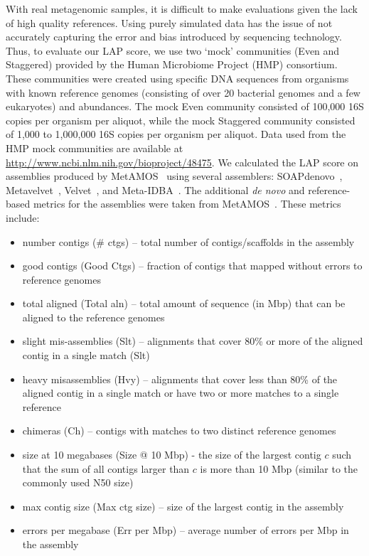 \documentclass[12pt,\mydriver]{thesis}
\begin{document}
With real metagenomic samples, it is difficult to make evaluations given the lack of high quality references.
Using purely simulated data has the issue of not accurately capturing the error and bias introduced by sequencing technology.
Thus, to evaluate our LAP score, we use two `mock' communities (Even and Staggered) provided by the Human Microbiome Project (HMP) consortium\cite{mitreva2012structure,methe2012framework}.
These communities were created using specific DNA sequences from organisms with known reference genomes (consisting of over 20 bacterial genomes and a few eukaryotes) and abundances.
The mock Even community consisted of 100,000 16S copies per organism per aliquot, while the mock Staggered community consisted of 1,000 to 1,000,000 16S copies per organism per aliquot.
Data used from the HMP mock communities are available at \url{http://www.ncbi.nlm.nih.gov/bioproject/48475}.
We calculated the LAP score on assemblies produced by MetAMOS~\cite{treangen2013metamos} using several assemblers: SOAPdenovo~\cite{luo2012soapdenovo2}, Metavelvet~\cite{namiki2012metavelvet}, Velvet~\cite{Velvet}, and Meta-IDBA~\cite{peng2011meta}.
The additional \emph{de novo} and reference-based metrics for the assemblies were taken from MetAMOS~\cite{treangen2013metamos}.  These metrics include:
   \begin{itemize}
   \item number contigs (\# ctgs) -- total number of contigs/scaffolds in the assembly
   \item good contigs (Good Ctgs) -- fraction of contigs that mapped without errors to reference genomes
   \item total aligned (Total aln) -- total amount of sequence (in Mbp) that can be aligned to the reference genomes
   \item slight mis-assemblies (Slt) -- alignments that cover 80\% or more of the aligned contig in a single match (Slt)
   \item heavy misassemblies (Hvy) -- alignments that cover less than 80\% of the aligned contig in a single match or have two or more matches to a single reference
   \item chimeras (Ch) -- contigs with matches to two distinct reference genomes
   \item size at 10 megabases (Size @ 10 Mbp) - the size of the largest contig $c$ such that the sum of all contigs larger than $c$ is more than 10 Mbp (similar to the commonly used N50 size)
   \item max contig size (Max ctg size) -- size of the largest contig in the assembly
   \item errors per megabase (Err per Mbp) -- average number of errors per Mbp in the assembly
   \end{itemize}
\end{document}
